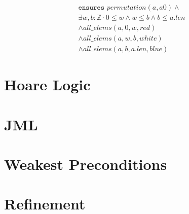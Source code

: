 \documentclass[landscape]{cheat}
\begin{document}
\begin{multicols*}{3}
\begin{multline*}
\texttt{ensures } permutation(a, a0) \land \\
    \exists w, b : \mathbb{Z} \cdot 0 \leq w \land w \leq b \land b \leq a.len \\
    \land all\_elems(a, 0, w, red) \\
    \land all\_elems(a, w, b, white) \\
    \land all\_elems(a, b, a.len, blue)
\end{multline*}

\section{Hoare Logic}

\section{JML}

\section{Weakest Preconditions}

\section{Refinement}

\end{multicols*}
\end{document}
